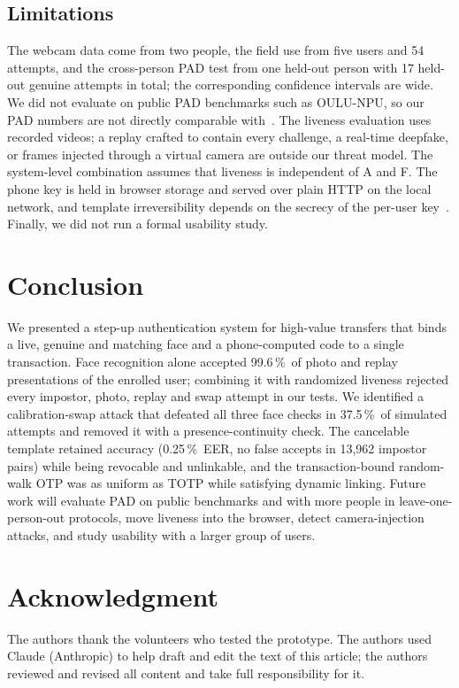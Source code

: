 \documentclass{ieeeaccess}
\newcommand{\pct}{\,\%}
\begin{document}
\subsection{Limitations}
\label{sec:limits}
The webcam data come from two people, the field use from five users and 54 attempts, and the
cross-person PAD test from one held-out person with 17 held-out genuine attempts in total; the
corresponding confidence intervals are wide. We did not evaluate on public PAD benchmarks such as
OULU-NPU, so our PAD numbers are not directly comparable with~\cite{cdcn,ssdg}. The liveness evaluation
uses recorded videos; a replay crafted to contain every challenge, a real-time deepfake, or frames
injected through a virtual camera are outside our threat model. The system-level combination assumes
that liveness is independent of A and F. The phone key is held in browser storage and served over
plain HTTP on the local network, and template irreversibility depends on the secrecy of the per-user
key~\cite{kong2006}. Finally, we did not run a formal usability study.

\section{Conclusion}
\label{sec:conclusion}
We presented a step-up authentication system for high-value transfers that binds a live, genuine and
matching face and a phone-computed code to a single transaction. Face recognition alone accepted 99.6\pct\
of photo and replay presentations of the enrolled user; combining it with randomized liveness rejected
every impostor, photo, replay and swap attempt in our tests. We identified a calibration-swap attack that
defeated all three face checks in 37.5\pct\ of simulated attempts and removed it with a
presence-continuity check. The cancelable template retained accuracy (0.25\pct\ EER, no false accepts in
13,962 impostor pairs) while being revocable and unlinkable, and the transaction-bound random-walk OTP
was as uniform as TOTP while satisfying dynamic linking. Future work will evaluate PAD on public
benchmarks and with more people in leave-one-person-out protocols, move liveness into the browser,
detect camera-injection attacks, and study usability with a larger group of users.

\section*{Acknowledgment}
The authors thank the volunteers who tested the prototype.  %
The authors used Claude (Anthropic) to help draft and edit the text of this article; the authors
reviewed and revised all content and take full responsibility for it.  %
\end{document}
